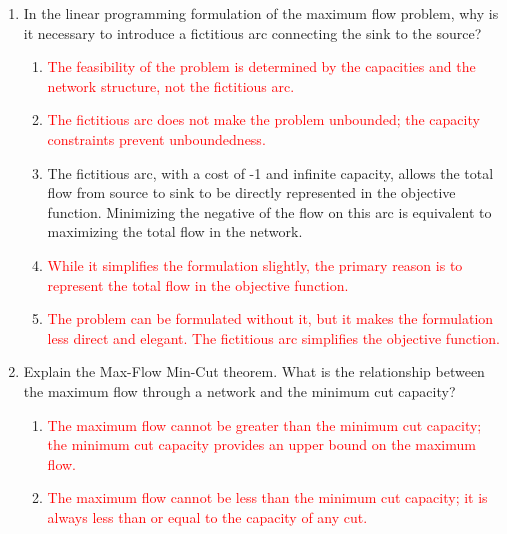 \documentclass{article}%
\newcommand{\incorrect}[1]{\textcolor{red}{#1}}
\begin{document}
\begin{enumerate}
\begin{enumerate}
\item \incorrect{Augmenting paths go from source to sink, not sink to source.  The direction is crucial for increasing flow.}%
\item \incorrect{Augmenting paths are not arbitrary; they must have available capacity along each edge to increase the flow systematically.}%
\item \incorrect{An augmenting path is not a cut; a cut is a partition of the nodes. Cuts are used to determine a bound on the maximum flow, not to increase it iteratively.}%
\end{enumerate}%
\vspace{1em}%
\item In the linear programming formulation of the maximum flow problem, why is it necessary to introduce a fictitious arc connecting the sink to the source?%
\begin{enumerate}%
\item \incorrect{The feasibility of the problem is determined by the capacities and the network structure, not the fictitious arc.}%
\item \incorrect{The fictitious arc does not make the problem unbounded; the capacity constraints prevent unboundedness.}%
\item The fictitious arc, with a cost of -1 and infinite capacity, allows the total flow from source to sink to be directly represented in the objective function.  Minimizing the negative of the flow on this arc is equivalent to maximizing the total flow in the network.%
\item \incorrect{While it simplifies the formulation slightly, the primary reason is to represent the total flow in the objective function.}%
\item \incorrect{The problem can be formulated without it, but it makes the formulation less direct and elegant. The fictitious arc simplifies the objective function.}%
\end{enumerate}%
\vspace{1em}%
\item Explain the Max-Flow Min-Cut theorem.  What is the relationship between the maximum flow through a network and the minimum cut capacity?%
\begin{enumerate}%
\item \incorrect{The maximum flow cannot be greater than the minimum cut capacity; the minimum cut capacity provides an upper bound on the maximum flow.}%
\item \incorrect{The maximum flow cannot be less than the minimum cut capacity; it is always less than or equal to the capacity of any cut.}%

\end{enumerate}
\end{enumerate}
\end{document}
